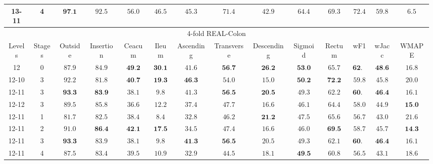 \begin{table}[t]
\begin{center}
{\begin{tabular}{@{}|cc|ccccccccc|ccc|@{}}
13-11 & 4 & \(\textbf{97.1}\) & \(92.5\) & \(56.0\) & \(46.5\) & \(45.3\) & \(71.4\) & \(42.9\) & \(64.4\) & \(69.3\) & \(72.4\) & \(59.8\) & \(6.5\) \\
\midrule
\midrule
\multicolumn{14}{|c|}{4-fold REAL-Colon} \\
\midrule
Levels & Stages & Outside & Insertion & Ceacum & Ileum & Ascending & Transverse & Descending & Sigmoid & Rectum &  wF1 & wJacc & WMAPE \\
\midrule
12 & 0 &\(87.9\) & \(84.9\) & \(\textbf{49.2}\) & \(\textbf{30.1}\) & \(41.6\) & \(\textbf{56.7}\) & \(\textbf{26.2}\) & \(\textbf{53.0}\) & \(65.7\) & \(\textbf{62.7}\) & \(\textbf{48.6}\) & \(16.8\) \\
\midrule
12-10 & 3 & \(92.2\) & \(81.8\) & \(\textbf{40.7}\) & \(\textbf{19.3}\) & \(\textbf{46.3}\) & \(54.0\) & \(15.0\) & \(\textbf{50.2}\) & \(\textbf{72.2}\) & \(59.8\) & \(45.8\) & \(20.0\) \\
12-11 & 3 & \(\textbf{93.3}\) & \(\textbf{83.9}\) & \(38.1\) & \(9.8\) & \(41.3\) & \(\textbf{56.5}\) & \(\textbf{20.5}\) & \(49.3\) & \(62.2\) & \(\textbf{60.2}\) & \(\textbf{46.4}\) & \(16.1\) \\
12-12 & 3 & \(89.5\) & \(85.8\) & \(36.6\) & \(12.2\) & \(37.4\) & \(47.7\) & \(16.6\) & \(46.1\) & \(64.4\) & \(58.0\) & \(44.9\) & \(\textbf{15.0}\) \\
\midrule
12-11 & 1 & \(81.7\) & \(82.5\) & \(38.4\) & \(8.4\) & \(32.8\) & \(46.2\) & \(\textbf{21.2}\) & \(47.5\) & \(65.6\) & \(56.7\) & \(43.0\) & \(21.6\) \\
12-11 & 2 & \(91.0\) & \(\textbf{86.4}\) & \(\textbf{42.1}\) & \(\textbf{17.5}\) & \(34.5\) & \(47.4\) & \(16.6\) & \(46.0\) & \(\textbf{69.5}\) & \(58.7\) & \(45.7\) & \(\textbf{14.3}\) \\
12-11 & 3 & \(\textbf{93.3}\) & \(83.9\) & \(38.1\) & \(9.8\) & \(\textbf{41.3}\) & \(\textbf{56.5}\) & \(20.5\) & \(49.3\) & \(62.1\) & \(\textbf{60.2}\) & \(\textbf{46.4}\) & \(16.1\) \\
12-11 & 4 & \(87.5\) & \(83.4\) & \(39.5\) & \(10.9\) & \(32.9\) & \(44.5\) & \(18.1\) & \(\textbf{49.5}\) & \(60.8\) & \(56.5\) & \(43.1\) & \(18.6\) \\
\midrule
\bottomrule
\end{tabular}}
\end{center}
\label{tbl:stages}
\end{table}
